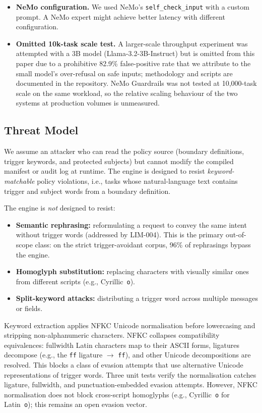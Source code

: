 \documentclass[11pt,a4paper]{article}
\begin{document}
\begin{itemize}[nosep]
  \item \textbf{NeMo configuration.} We used NeMo's
    \texttt{self\_check\_input} with a custom prompt. A NeMo expert might
    achieve better latency with different configuration.
  \item \textbf{Omitted 10k-task scale test.} A larger-scale throughput
    experiment was attempted with a 3B model (Llama-3.2-3B-Instruct)
    but is omitted from this paper due to a prohibitive 82.9\%
    false-positive rate that we attribute to the small model's
    over-refusal on safe inputs; methodology and scripts are
    documented in the repository. NeMo Guardrails was not tested at
    10{,}000-task scale on the same workload, so the relative scaling
    behaviour of the two systems at production volumes is unmeasured.
\end{itemize}

\subsection{Threat Model}
\label{sec:threat}

We assume an attacker who can read the policy source (boundary
definitions, trigger keywords, and protected subjects) but cannot modify
the compiled manifest or audit log at runtime. The engine is designed to
resist \emph{keyword-matchable} policy violations, i.e., tasks whose
natural-language text contains trigger and subject words from a
boundary definition.

The engine is \emph{not} designed to resist:
\begin{itemize}[nosep]
  \item \textbf{Semantic rephrasing:} reformulating a request to
    convey the same intent without trigger words (addressed by LIM-004).
    This is the primary out-of-scope class: on the strict
    trigger-avoidant corpus, 96\% of rephrasings bypass the engine.
  \item \textbf{Homoglyph substitution:} replacing characters with
    visually similar ones from different scripts (e.g., Cyrillic~\texttt{o}).
  \item \textbf{Split-keyword attacks:} distributing a trigger word
    across multiple messages or fields.
\end{itemize}

Keyword extraction applies NFKC Unicode normalisation before
lowercasing and stripping non-alphanumeric characters. NFKC collapses
compatibility equivalences: fullwidth Latin characters map to their
ASCII forms, ligatures decompose (e.g., the \texttt{ff} ligature
$\to$ \texttt{ff}), and other Unicode decompositions are resolved.
This blocks a class of evasion attempts that use alternative Unicode
representations of trigger words. Three unit tests verify the
normalisation catches ligature, fullwidth, and punctuation-embedded
evasion attempts. However, NFKC normalisation does not block
cross-script homoglyphs (e.g., Cyrillic~\texttt{o} for
Latin~\texttt{o}); this remains an open evasion vector.
\end{document}
